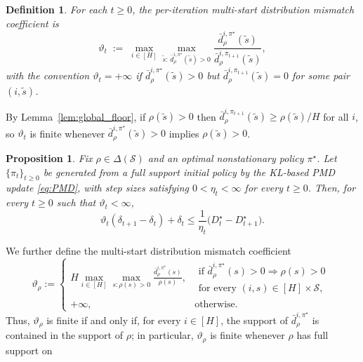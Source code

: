 \documentclass[11pt]{article}
\newtheorem{defi}{Definition}
\newtheorem{prop}{Proposition}
\begin{document}
\begin{defi}
\label{def:vartheta_k_multistart}
For each $t\ge 0$, the per-iteration multi-start distribution mismatch
coefficient is
\begin{equation}
\label{eq:vartheta_k_multistart}
\vartheta_t
\;:=\;
\max_{i\in[H]}
\max_{\tilde{s}:\,\bar d^{i,\pi^\star}_\rho(\tilde{s})>0}
\frac{\bar d^{i,\pi^\star}_\rho(\tilde{s})}{\bar d^{i,\pi_{t+1}}_\rho(\tilde{s})},
\end{equation}
with the convention $\vartheta_t=+\infty$ if
$\bar d^{i,\pi^\star}_\rho(\tilde{s})>0$ but
$\bar d^{i,\pi_{t+1}}_\rho(\tilde{s})=0$ for some pair $(i,\tilde{s})$.
\end{defi}
By Lemma~\ref{lem:global_floor}, if $\rho(\tilde{s})>0$ then
$\bar d^{i,\pi_{t+1}}_\rho(\tilde{s})\ge \rho(\tilde{s})/H$ for all $i$, so
$\vartheta_t$ is finite whenever $\bar d^{i,\pi^\star}_\rho(\tilde{s})>0$
implies $\rho(\tilde{s})>0$.
\begin{prop}
\label{prop:key_multistart}
Fix $\rho\in\Delta(\mathcal S)$ and an optimal nonstationary policy
$\pi^\star$. Let $\{\pi_t\}_{t\ge0}$ be generated from a full support initial
policy by the KL-based PMD update \eqref{eq:PMD}, with step sizes satisfying
$0<\eta_t<\infty$ for every $t\ge0$. Then, for every $t\ge0$ such that
$\vartheta_t<\infty$,
\begin{equation}
\label{eq:key_multistart}
\vartheta_t(\delta_{t+1}-\delta_t)+\delta_t
\le
\frac{1}{\eta_t}
\bigl(D_t^\star-D_{t+1}^\star\bigr).
\end{equation}
\end{prop}
We further define the multi-start distribution mismatch coefficient
\begin{equation}
\label{eq:vartheta_def_repeat}
\vartheta_\rho
:=
\begin{cases}
\displaystyle
H
\max_{i\in[H]}
\max_{s:\rho(s)>0}
\frac{\bar d^{i,\pi^\star}_\rho(s)}{\rho(s)},
&
\begin{array}{l}
\text{if }
\bar d^{i,\pi^\star}_\rho(s)>0
\Longrightarrow
\rho(s)>0\\[-1pt]
\text{for every }(i,s)\in[H]\times\mathcal S,
\end{array}
\\[1.4em]
+\infty,
&
\text{otherwise}.
\end{cases}
\end{equation}
Thus, $\vartheta_\rho$ is finite if and only if, for every $i\in[H]$, the
support of $\bar d^{i,\pi^\star}_\rho$ is contained in the support of $\rho$;
in particular, $\vartheta_\rho$ is finite whenever $\rho$ has full support on
\end{document}
